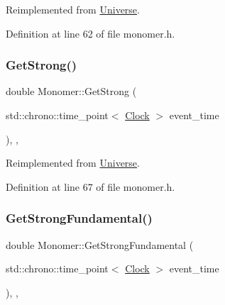 Reimplemented from \hyperlink{class_universe_ab0404e774ee0ed66b597ff5b8e989446}{Universe}.



Definition at line 62 of file monomer.\+h.

\mbox{\label{class_monomer_aa35033340e88c46757d1d5ccba21a21e}} 
\subsubsection{\texorpdfstring{Get\+Strong()}{GetStrong()}}
{\footnotesize\ttfamily double Monomer\+::\+Get\+Strong (\begin{DoxyParamCaption}\item[{std\+::chrono\+::time\+\_\+point$<$ \hyperlink{universe_8h_a0ef8d951d1ca5ab3cfaf7ab4c7a6fd80}{Clock} $>$}]{event\+\_\+time }\end{DoxyParamCaption})\hspace{0.3cm}{\ttfamily [inline]}, {\ttfamily [final]}, {\ttfamily [virtual]}}



Reimplemented from \hyperlink{class_universe_acb453ce71da418c5b5617fecede9571b}{Universe}.



Definition at line 67 of file monomer.\+h.

\mbox{\label{class_monomer_a4bc8b39086260e26a196b28b4fc6667f}} 
\subsubsection{\texorpdfstring{Get\+Strong\+Fundamental()}{GetStrongFundamental()}}
{\footnotesize\ttfamily double Monomer\+::\+Get\+Strong\+Fundamental (\begin{DoxyParamCaption}\item[{std\+::chrono\+::time\+\_\+point$<$ \hyperlink{universe_8h_a0ef8d951d1ca5ab3cfaf7ab4c7a6fd80}{Clock} $>$}]{event\+\_\+time }\end{DoxyParamCaption})\hspace{0.3cm}{\ttfamily [inline]}, {\ttfamily [final]}, {\ttfamily [virtual]}}



